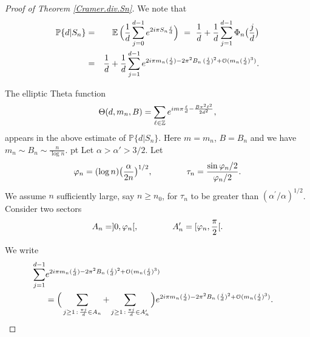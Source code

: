 \documentclass[11pt,draft,reqno]{amsart}
\theoremstyle{definition}
\theoremstyle{remarks}
\numberwithin{equation}{section}
\def \a{{\alpha}}
\def \p{{\varphi}}
\def \qq{{\qquad}}
\def\P{{\mathcal P}}
\def\E{{\mathbb E \,}}
\def\P{{\mathbb P}}
\def\Z{{\mathbb Z}}
\begin{document}
\begin{proof}[Proof of Theorem \ref{Cramer.div.Sn}]  We note that 
\begin{eqnarray}\label{div.Sn}\P\{ d|S_n\}
&=& \E \Big(\frac{1}{d}  \sum_{j=0}^{d-1} 
e^{2i\pi S_n \frac{j}{d}}\Big) \ = \ 
\frac{1}{d}  +\frac{1}{d}  \sum_{j=1}^{d-1} \Phi_n \big(  \frac{j}{d}\big)
\cr &= &\frac{1}{d}+ \frac{1}{d}  \sum_{j=1}^{d-1} 
e^{ 2i \pi m_n(\frac{j}{d})  - 2\pi^2  B_n\,(\frac{j}{d})^2+\mathcal O (m_n(\frac{j}{d})^3 ) } 
.\end{eqnarray}

The    elliptic Theta function $$  \Theta (d,m_n,B)  =  \sum_{\ell\in \Z} e^{im\pi{\ell\over   d }-{B\pi^2\ell^2\over 2 d^2}}, 
 $$
 appears in the above estimate of $\P\{d|S_n\}$. 
Here $m=m_n$, $B=B_n$ and we have $m_n\sim B_n\sim \frac{n}{\log n}$. 
\vskip 3 pt 
 Let 
 $\a>\a'>3/2$. Let
 $$\p_n= ( \log n) \big( { \a \over 2 n}\big)^{1/2},
\qquad\qquad \tau_n= {\sin\p_n/2\over
\p_n /2}.
$$ 
We assume
$n$ sufficiently large, say $n\ge
n_0$, for $\tau_n$ to be greater than $(\a^\prime/\a)^{1/2}$.  Consider two sectors
  $$A_n = ]0,\p_n[,  \qq\qq A'_n=[ \p_n, {\pi\over 2} [.$$ 

 We write 
 \begin{align*}   \sum_{j=1}^{d-1} 
&e^{ 2i \pi m_n(\frac{j}{d})  - 2\pi^2  B_n\, (\frac{j}{d})^2 +\mathcal O (m_n(\frac{j}{d})^3 ) }\cr &= \Big( \sum_{ j\ge 1\, :\, { \pi j\over d}\in A_n}+\sum_{ j\ge 1\, :\, { \pi j\over d}\in A'_n}
\Big)
e^{ 2i \pi m_n(\frac{j}{d})  - 2\pi^2  B_n\,(\frac{j}{d})^2+\mathcal O (m_n(\frac{j}{d})^3 ) } . 
\end{align*}  


\end{proof}
\end{document}
